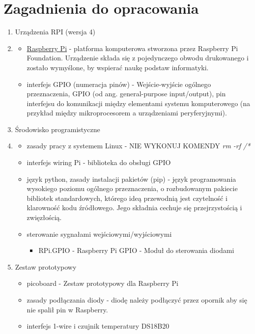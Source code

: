 \documentclass[a4paper,12pt]{extarticle}  %
\begin{document}
\section{Zagadnienia do opracowania}
\begin{enumerate}
    \item Urządzenia RPI (wersja 4)
    \item \begin{itemize}
        \item \href{https://www.raspberrypi.org/}{Raspberry Pi} - platforma komputerowa stworzona przez Raspberry Pi Foundation. Urządzenie składa się z pojedynczego obwodu drukowanego i zostało wymyślone, by wspierać naukę podstaw informatyki.
        \item interfejs GPIO (numeracja pinów) - Wejście-wyjście ogólnego przeznaczenia, GPIO (od ang. general-purpose input/output), pin interfejsu do komunikacji między elementami systemu komputerowego (na przykład między mikroprocesorem a urządzeniami peryferyjnymi). 
    \end{itemize}
    \item Środowisko programistyczne
    \item \begin{itemize}
        \item zasady pracy z systemem Linux - NIE WYKONUJ KOMENDY \emph{rm -rf /*}
        \item interfejs wiring Pi - biblioteka do obsługi GPIO
        \item język python, zasady instalacji pakietów (pip) - język programowania wysokiego poziomu ogólnego przeznaczenia, o rozbudowanym pakiecie bibliotek standardowych, którego ideą przewodnią jest czytelność i klarowność kodu źródłowego. Jego składnia cechuje się przejrzystością i zwięzłością. 
        \item sterowanie sygnałami wejściowymi/wyjściowymi
        \begin{itemize}
            \item RPi.GPIO - Raspberry Pi GPIO - Moduł do sterowania diodami
        \end{itemize}
    \end{itemize}
    \item Zestaw prototypowy
    \begin{itemize}
        \item picoboard - Zestaw prototypowy dla Raspberry Pi 
        \item zasady podłączania diody - diodę należy podłączyć przez opornik aby się nie spalił pin w Raspberry.
        \item interfejs 1-wire i czujnik temperatury DS18B20
    \end{itemize}
\end{enumerate}
\end{document}
